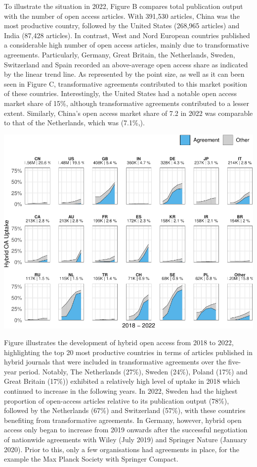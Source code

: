 \documentclass[a4paper,man,floatsintext,longtable,noextraspace,12pt]{apa6}
\begin{document}
To illustrate the situation in 2022, Figure B compares total publication
output with the number of open access articles. With 391,530 articles,
China was the most productive country, followed by the United States
(268,965 articles) and India (87,428 articles). In contrast, West and
Nord European countries published a considerable high number of open
access articles, mainly due to transformative agreements. Particularly,
Germany, Great Britain, the Netherlands, Sweden, Switzerland and Spain
recorded an above-average open access share as indicated by the linear
trend line. As represented by the point size, as well as it can been
seen in Figure C, transformative agreements contributed to this market
position of these countries. Interestingly, the United States had a
notable open access market share of 15\%, although transformative
agreements contributed to a lesser extent. Similarly, China's open
access market share of 7.2 in 2022 was comparable to that of the
Netherlands, which was (7.1\%,).

\begin{center}\includegraphics[width=0.99\linewidth]{fig/country_top_20_plot-1} \end{center}

Figure illustrates the development of hybrid open access from 2018 to
2022, highlighting the top 20 most productive countries in terms of
articles published in hybrid journals that were included in
transformative agreements over the five-year period. Notably, The
Netherlands (27\%), Sweden (24\%), Poland (17\%) and Great Britain
(17\%)) exhibited a relatively high level of uptake in 2018 which
continued to increase in the following years. In 2022, Sweden had the
highest proportion of open-access articles relative to its publication
output (78\%), followed by the Netherlands (67\%) and Switzerland
(57\%), with these countries benefiting from transformative agreements.
In Germany, however, hybrid open access only began to increase from 2019
onwards after the successful negotiation of nationwide agreements with
Wiley (July 2019) and Springer Nature (January 2020). Prior to this,
only a few organisations had agreements in place, for the example the
Max Planck Society with Springer Compact.
\end{document}
